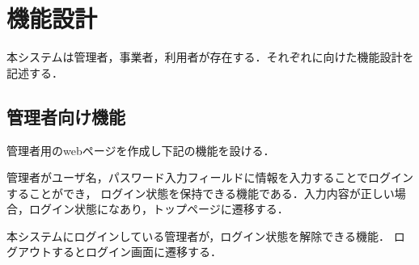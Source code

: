 \documentclass[a4paper, titlepage]{jsarticle}
\begin{document}
\section{機能設計}
本システムは管理者，事業者，利用者が存在する．それぞれに向けた機能設計を記述する．
\clearpage
\subsection{管理者向け機能}
管理者用のwebページを作成し下記の機能を設ける．
\begin{description}[labelwidth=\linewidth]
  \setlength{\leftskip}{1em}

  \item [ログイン機能] 管理者がユーザ名，パスワード入力フィールドに情報を入力することでログインすることができ，
  ログイン状態を保持できる機能である．入力内容が正しい場合，ログイン状態になあり，トップページに遷移する．
  \item [ログアウト機能] 本システムにログインしている管理者が，ログイン状態を解除できる機能．
  ログアウトするとログイン画面に遷移する．




\end{description}
\end{document}
